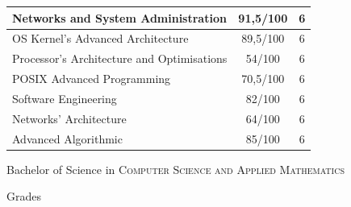 \documentclass[a4paper,10pt]{article} %
\begin{document}
\begin{center}
\begin{tabular}{lcc}
Networks and System Administration                         &  91,5/100 & 6 \\
\hline
OS Kernel's Advanced Architecture                          &  89,5/100 & 6     \\
Processor's Architecture and Optimisations                 &    54/100 & 6     \\
POSIX Advanced Programming                                 &  70,5/100 & 6     \\
Software Engineering                                       &    82/100 & 6     \\
Networks' Architecture	                                   &    64/100 & 6     \\
Advanced Algorithmic                                       &    85/100 & 6 \\
\hline
\end{tabular}
\end{center}
\bigskip
\bigskip


\newpage

\par{\centering\Large \hypertarget{grds_bs}{Bachelor of Science in \textsc{Computer Science and Applied Mathematics}}\par}\large{\centering Grades\par}\normalsize
\end{document}
